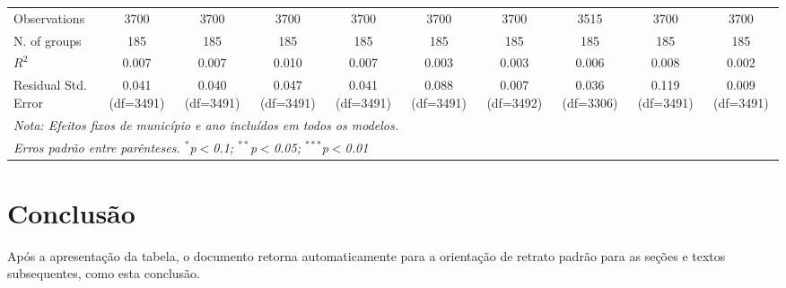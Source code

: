 \documentclass[12pt, a4paper]{article}
\begin{document}
\begin{landscape}
\begin{table}[p]
{\begin{tabular}{@{\extracolsep{5pt}}lccccccccc}
 Observations & 3700 & 3700 & 3700 & 3700 & 3700 & 3700 & 3515 & 3700 & 3700 \\
 N. of groups & 185 & 185 & 185 & 185 & 185 & 185 & 185 & 185 & 185 \\
 $R^2$ & 0.007 & 0.007 & 0.010 & 0.007 & 0.003 & 0.003 & 0.006 & 0.008 & 0.002 \\
 Residual Std. Error & 0.041 (df=3491) & 0.040 (df=3491) & 0.047 (df=3491) & 0.041 (df=3491) & 0.088 (df=3491) & 0.007 (df=3492) & 0.036 (df=3306) & 0.119 (df=3491) & 0.009 (df=3491) \\
\bottomrule %
\multicolumn{10}{l}{\textit{Nota: Efeitos fixos de município e ano incluídos em todos os modelos.}} \\
\multicolumn{10}{l}{\textit{Erros padrão entre parênteses. $^{*}$p$<$0.1; $^{**}$p$<$0.05; $^{***}$p$<$0.01}} \\
\end{tabular}
} %
\end{table}

\end{landscape} %



\section{Conclusão}
Após a apresentação da tabela, o documento retorna automaticamente para a orientação de retrato padrão para as seções e textos subsequentes, como esta conclusão.


\end{document}

